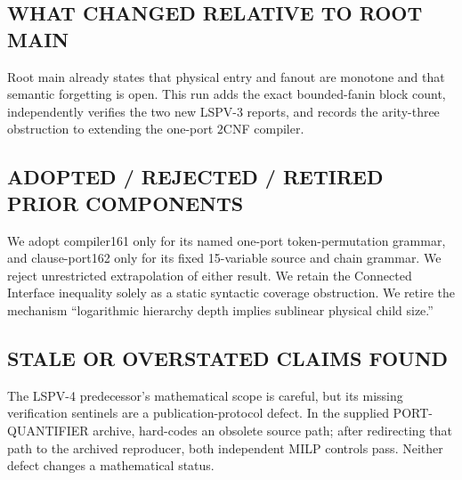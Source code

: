 \documentclass[11pt]{article}
\begin{document}
\subsection*{WHAT CHANGED RELATIVE TO ROOT MAIN}
Root main already states that physical entry and fanout are monotone and that
semantic forgetting is open.  This run adds the exact bounded-fanin block
count, independently verifies the two new LSPV-3 reports, and records the
arity-three obstruction to extending the one-port $2$CNF compiler.

\subsection*{ADOPTED / REJECTED / RETIRED PRIOR COMPONENTS}
We adopt compiler161 only for its named one-port token-permutation grammar,
and clause-port162 only for its fixed 15-variable source and chain grammar.
We reject unrestricted extrapolation of either result.  We retain the
Connected Interface inequality solely as a static syntactic coverage
obstruction.  We retire the mechanism ``logarithmic hierarchy depth implies
sublinear physical child size.''

\subsection*{STALE OR OVERSTATED CLAIMS FOUND}
The LSPV-4 predecessor's mathematical scope is careful, but its missing
verification sentinels are a publication-protocol defect.  In the supplied
PORT-QUANTIFIER archive,  hard-codes an
obsolete  source path; after redirecting that path to the
archived reproducer, both independent MILP controls pass.  Neither defect
changes a mathematical status.
\end{document}
